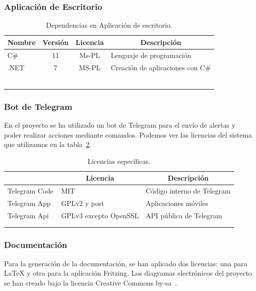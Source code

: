 \subsubsection{Aplicación de Escritorio}
\footnotesize%
\begin{longtable}[c]{@{}lccl@{}}
\toprule
\multicolumn{1}{c}{\textbf{Nombre}} & \textbf{Versión} & \textbf{Licencia} & \multicolumn{1}{c}{\textbf{Descripción}} \\ \midrule
\endfirsthead
%
\endhead
%
\bottomrule
\endfoot
%
\endlastfoot
%
C\# & 11 & Ms-PL & Lenguaje de programación\\
.NET	& 7 & MS-PL & Creación de aplicaciones con C\#\\
\bottomrule~\\
\caption{Dependencias en Aplicación de escritorio.}
\label{tab:BackEnd}
\end{longtable}
\normalsize

\subsubsection{Bot de Telegram}

En el proyecto se ha utilizado un bot de Telegram para el envío de alertas y poder realizar acciones mediante comandos. Podemos ver las licencias del sistema que utilizamos en la tabla~\ref{tab:lienciaTelegram}.

\begin{longtable}[c]{@{}lll@{}}
\toprule
\centering
\multicolumn{1}{c}{\textbf{Nombre}} & \multicolumn{1}{c}{\textbf{Licencia}} & \multicolumn{1}{c}{\textbf{Descripción}} \\ \midrule
\endfirsthead
%
\endhead
%
\bottomrule
\endfoot
%
\endlastfoot
%
Telegram Code & MIT & Código interno de Telegram \\
Telegram App~\cite{misc:TelegramApps} & GPLv2 y post & Aplicaciones móviles \\
Telegram Api~\cite{misc:Telegram_api} & GPLv3 excepto OpenSSL & API pública de Telegram \\ \bottomrule \\
\caption{Licencias específicas.}
\label{tab:lienciaTelegram}
\end{longtable}


\subsubsection{Documentación}
Para la generación de la documentación, se han aplicado dos licencias: una para \LaTeX{} y otra para la aplicación Fritzing. Los diagramas electrónicos del proyecto se han creado bajo la licencia Creative Commons by-sa~\cite{wiki:CreativeCommons}.

